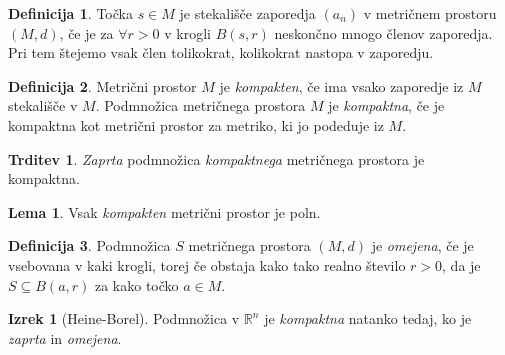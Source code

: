 \documentclass[11pt]{article}
\theoremstyle{definition}
\newtheorem{definicija}{Definicija}[section]
\theoremstyle{definition}
\newtheorem{trditev}{Trditev}[section]
\theoremstyle{definition}
\newtheorem{izrek}{Izrek}[section]
\newtheorem{lema}{Lema}
\begin{document}
\begin{definicija}

Točka $s \in M$ je stekališče zaporedja $(a_n)$ v metričnem prostoru $(M, d)$, če je za $\forall r > 0$ v krogli $B(s, r)$ neskončno mnogo členov zaporedja. Pri tem štejemo vsak člen tolikokrat, kolikokrat nastopa v zaporedju.

\end{definicija}
\vspace{0.5cm}

\begin{definicija}

Metrični prostor $M$ je \textit{kompakten}, če ima vsako zaporedje iz $M$ stekališče v $M$. Podmnožica metričnega prostora $M$ je \textit{kompaktna}, če je kompaktna kot metrični prostor za metriko, ki jo podeduje iz $M$.

\end{definicija}
\vspace{0.5cm}

\begin{trditev}

\textit{Zaprta} podmnožica \textit{kompaktnega} metričnega prostora je \\kompaktna.

\end{trditev}
\vspace{0.5cm}

\begin{lema}

Vsak \textit{kompakten} metrični prostor je poln.

\end{lema}
\vspace{0.5cm}

\begin{definicija}

Podmnožica $S$ metričnega prostora $(M, d)$ je \textit{omejena}, če je vsebovana v kaki krogli, torej če obstaja kako tako realno število $r > 0$, da je $S \subseteq B(a, r)$ za kako točko $a \in M$. 

\end{definicija}
\vspace{0.5cm}

\begin{izrek}[Heine-Borel]

Podmnožica v $\mathbb{R}^n$ je \textit{kompaktna} natanko tedaj, ko je \textit{zaprta} in \textit{omejena}.

\end{izrek}
\vspace{0.5cm}
\end{document}
